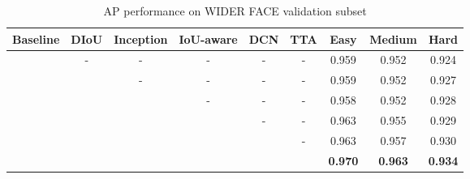 \documentclass[final]{cvpr}
\begin{document}
\begin{table*}[ht]
 \caption{AP performance on WIDER FACE validation subset}
  \centering
  \begin{tabular}{ c c c c c c | c c c }
    \toprule
    Baseline & DIoU & Inception &  IoU-aware & DCN & TTA & Easy & Medium & Hard \\
    \midrule
     & - & - & - & - & - & 0.959 & 0.952 & 0.924  \\
     &  & - & - & - & - & 0.959 & 0.952 & 0.927  \\
     &  &  & - & - & - & 0.958 & 0.952 & 0.928  \\
     &  &  &  & - & - & 0.963 & 0.955 & 0.929  \\
     &  &  &  &  & - & 0.963 & 0.957 & 0.930  \\
     &  &  &  &  &  & \textbf{0.970} & \textbf{0.963} & \textbf{0.934}  \\
    \bottomrule
  \end{tabular}
  \label{tab:table1}
\end{table*}
\end{document}
